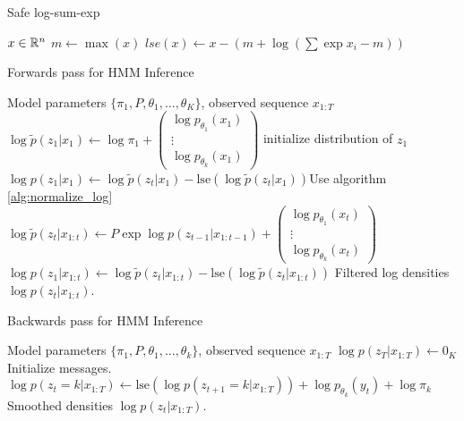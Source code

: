 \documentclass[14pt]{extreport}
\begin{document}
\begin{algorithm}
   \caption{Safe log-sum-exp}
   \label{alg:normalize_log}
   \begin{algorithmic}
      $x \in \mathbb{R}^{n}$
     \STATE $m \leftarrow \max\left(x\right)$
      $lse\left(x\right) \leftarrow x - \left(m + \log\left(\sum\exp{x_{i} - m}\right)\right)$
   \end{algorithmic}
\end{algorithm}

\begin{algorithm}
   \caption{Forwards pass for HMM Inference}
   \label{alg:hmm_forwards}
\begin{algorithmic}
   Model parameters $\{\pi_{1}, P, \theta_1, \dots, \theta_K\}$,
  observed sequence $x_{1:T}$
  \STATE $\log \tilde{p}\left(z_{1}\vert x_{1}\right) \leftarrow
  \log\pi_{1} + \begin{pmatrix} \log p_{\theta_{1}}\left(x_{1}\right) \\ \vdots \\ \log p_{\theta_{k}}\left(x_{1}\right) \end{pmatrix}$ \hfill initialize distribution of $z_{1}$
  \STATE $\log p\left(z_{1} \vert x_{1}\right) \leftarrow \log \tilde{p}\left(z_{t} \vert x_{1}\right) - \text{lse}\left(\log \tilde{p}\left(z_{t} \vert x_{1}\right)\right)$\hfill Use algorithm \ref{alg:normalize_log}
  \STATE $\log \tilde{p}\left(z_{t} \vert x_{1:t}\right) \leftarrow P \exp{\log p\left(z_{t - 1} \vert x_{1:t - 1}\right)} + \begin{pmatrix}  \log p_{\theta_{1}}\left(x_{t}\right) \\ \vdots \\ \log p_{\theta_{k}}\left(x_{t}\right) \end{pmatrix}$
  \STATE $\log p\left(z_{1} \vert x_{1:t}\right) \leftarrow \log \tilde{p}\left(z_{t} \vert x_{1:t}\right) - \text{lse}\left(\log \tilde{p}\left(z_{t} \vert x_{1:t}\right)\right)$\hfill
  \ENDFOR
   Filtered log densities $\log p\left(z_{t} \vert x_{1:t}\right)$.
\end{algorithmic}
\end{algorithm}

\begin{algorithm}
  \begin{algorithmic}
   \caption{Backwards pass for HMM Inference}
   \label{alg:hmm_backwards}
    Model parameters $\{\pi_{1}, P, \theta_1, \dots, \theta_k\}$, observed sequence $x_{1:T}$
   \STATE $\log p\left(z_{T} \vert x_{1:T}\right) \leftarrow 0_{K}$ \hfill Initialize messages.
   \STATE $\log p\left(z_{t} = k \vert x_{1:T}\right) \leftarrow \text{lse}\left(\log p\left(z_{t + 1} = k \vert x_{1:T}\right)\right) + \log p_{\theta_{k}}\left(y_{t}\right) + \log \pi_{k}$
   \ENDFOR
   \ENDFOR
    Smoothed densities $\log p\left(z_{t} \vert x_{1:T}\right)$.
  \end{algorithmic}
\end{algorithm}
\end{document}
